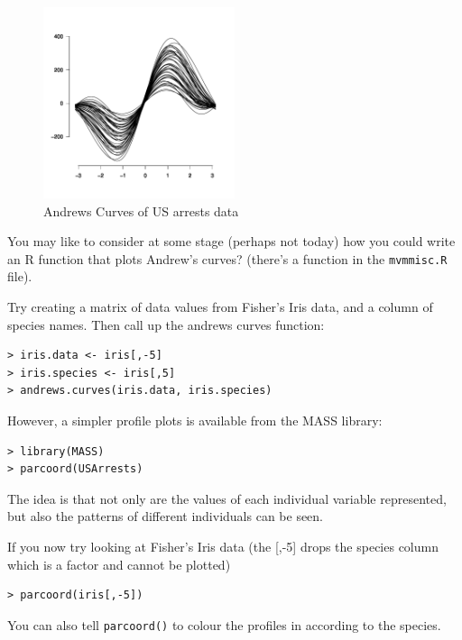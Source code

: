 \begin{figure}
\begin{center}
\includegraphics[width = 0.5\textwidth]{images/andrews}
\caption{Andrews Curves of US arrests data}
\end{center}
\end{figure}

You may like to consider at some stage (perhaps not today) how you could write an R function that plots Andrew's curves?   (there's a function in the \texttt{mvmmisc.R} file).

Try creating a matrix of data values from Fisher's Iris data, and a column of species names.   Then call up the andrews curves function:

\singlespacing
\begin{verbatim}
> iris.data <- iris[,-5]
> iris.species <- iris[,5]
> andrews.curves(iris.data, iris.species)
\end{verbatim}
\onehalfspacing


However, a simpler profile plots is available from the MASS library:

\singlespacing
\begin{verbatim}
> library(MASS)
> parcoord(USArrests)
\end{verbatim}
\onehalfspacing

The idea is that not only are the values of each individual variable represented, but also the patterns of different individuals can be seen.

If you now try looking at Fisher's Iris data (the [,-5] drops the species column which is a factor and cannot be plotted)

\singlespacing
\begin{verbatim}
> parcoord(iris[,-5])
\end{verbatim}
\onehalfspacing

You can also tell \texttt{parcoord()} to colour the profiles in according to the species.

